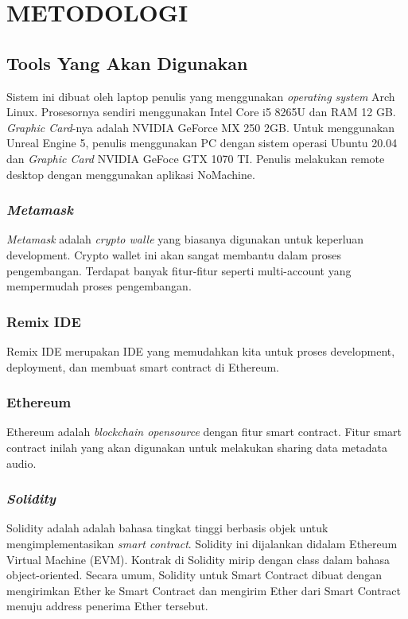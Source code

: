 \chapter{METODOLOGI}


\section{Tools Yang Akan Digunakan}

Sistem ini dibuat oleh laptop penulis yang menggunakan \emph{operating system} Arch Linux. Prosesornya sendiri menggunakan Intel Core i5
8265U dan RAM 12 GB. \emph{Graphic Card}-nya adalah NVIDIA GeForce MX 250 2GB. Untuk menggunakan Unreal Engine 5, penulis menggunakan PC
dengan sistem operasi Ubuntu 20.04 dan \emph{Graphic Card} NVIDIA GeFoce GTX 1070 TI. Penulis melakukan remote desktop dengan menggunakan aplikasi
NoMachine.

\subsection{\emph{Metamask}}
\emph{Metamask} adalah \emph{crypto walle} yang biasanya digunakan untuk keperluan development. Crypto wallet ini
akan sangat membantu dalam proses pengembangan. Terdapat banyak fitur-fitur seperti multi-account yang mempermudah proses pengembangan.

\subsection{Remix IDE}
Remix IDE merupakan IDE yang memudahkan kita untuk proses development, deployment, dan membuat smart contract di Ethereum.

\subsection{Ethereum}
Ethereum adalah \emph{blockchain opensource} dengan fitur smart contract. Fitur smart contract inilah yang akan digunakan untuk
melakukan sharing data metadata audio.

\subsection{\emph{Solidity}}
Solidity adalah adalah bahasa tingkat tinggi berbasis objek untuk mengimplementasikan
\emph{smart contract}. Solidity ini dijalankan didalam Ethereum Virtual Machine (EVM).
Kontrak di Solidity mirip dengan class dalam bahasa object-oriented.  Secara umum, Solidity untuk Smart Contract dibuat dengan mengirimkan
Ether ke Smart Contract dan mengirim Ether dari Smart Contract menuju address penerima Ether tersebut.


